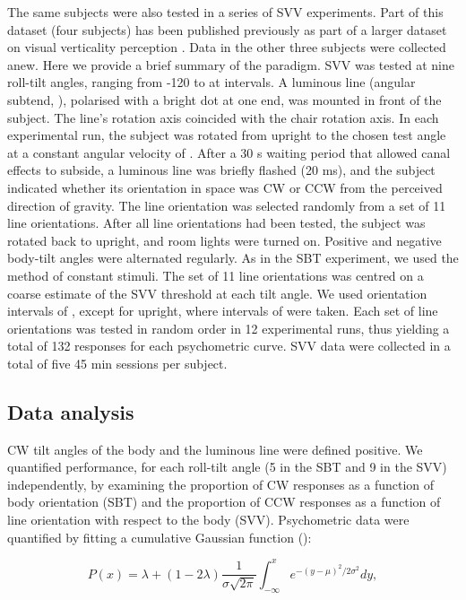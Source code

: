 The same subjects were also tested in a series of SVV experiments. Part of this dataset (four subjects) has been published previously as part of a larger dataset on visual verticality perception \cite{devrijer2009}. Data in the other three subjects were collected anew. Here we provide a brief summary of the paradigm. SVV was tested at nine roll-tilt angles, ranging from -120 to  at  intervals. A luminous line (angular subtend, ), polarised with a bright dot at one end, was mounted in front of the subject. The line's rotation axis coincided with the chair rotation axis. In each experimental run, the subject was rotated from upright to the chosen test angle at a constant angular velocity of . After a 30 \si{\second} waiting period that allowed canal effects to subside, a luminous line was briefly flashed (20 \si{\milli\second}), and the subject indicated whether its orientation in space was CW or CCW from the perceived direction of gravity. The line orientation was selected randomly from a set of 11 line orientations. After all line orientations had been tested, the subject was rotated back to upright, and room lights were turned on. Positive and negative body-tilt angles were alternated regularly. As in the SBT experiment, we used the method of constant stimuli. The set of 11 line orientations was centred on a coarse estimate of the SVV threshold at each tilt angle. We used orientation intervals of , except for upright, where intervals of  were taken. Each set of line orientations was tested in random order in 12 experimental runs, thus yielding a total of 132 responses for each psychometric curve. SVV data were collected in a total of five 45 min sessions per subject. 

\subsection{Data analysis}

CW tilt angles of the body and the luminous line were defined positive. We quantified performance, for each roll-tilt angle (5 in the SBT and 9 in the SVV) independently, by examining the proportion of CW responses as a function of body orientation (SBT) and the proportion of CCW responses as a function of line orientation with respect to the body (SVV). Psychometric data were quantified by fitting a cumulative Gaussian function (): 

\begin{equation}
\label{p1:eqn1}
P(x) = \lambda + (1 - 2\lambda) \frac{1}{\sigma \sqrt{2\pi}} \int_{-\infty}^{x}{e^{-(y-\mu)^2 / 2\sigma^2}}dy,
\end{equation}


